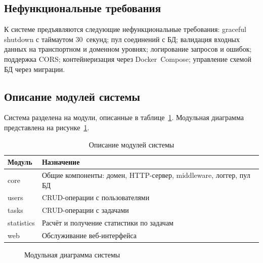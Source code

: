 \documentclass[a4paper,14pt]{extarticle}
\begin{document}
\subsection{Нефункциональные требования}

К системе предъявляются следующие нефункциональные требования: graceful shutdown с таймаутом 30~секунд; пул соединений с БД; валидация входных данных на транспортном и доменном уровнях; логирование запросов и ошибок; поддержка CORS; контейнеризация через Docker~Compose; управление схемой БД через миграции.

\subsection{Описание модулей системы}

Система разделена на модули, описанные в таблице~\ref{tab:modules}. Модульная диаграмма представлена на рисунке~\ref{fig:modules}.

\begin{table}[H]
\caption{Описание модулей системы}\label{tab:modules}
\centering
\small
\begin{tabularx}{\textwidth}{|l|X|}
\hline
\textbf{Модуль} & \textbf{Назначение} \\
\hline
core & Общие компоненты: домен, HTTP-сервер, middleware, логгер, пул БД \\
\hline
users & CRUD-операции с пользователями \\
\hline
tasks & CRUD-операции с задачами \\
\hline
statistics & Расчёт и получение статистики по задачам \\
\hline
web & Обслуживание веб-интерфейса \\
\hline
\end{tabularx}
\end{table}

\begin{figure}[H]
\centering
{}
\caption{Модульная диаграмма системы}\label{fig:modules}
\end{figure}
\end{document}
